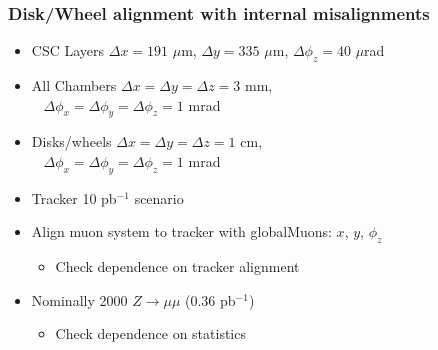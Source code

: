 \documentclass[compress]{beamer}
\begin{document}
\begin{frame}
\frametitle{Disk/Wheel alignment with internal misalignments}
\begin{itemize}\setlength{\itemsep}{0.25 cm}
  \item CSC Layers $\Delta x = 191$ $\mu$m, $\Delta y = 335$ $\mu$m, $\Delta \phi_z = 40$ $\mu$rad
  \item All Chambers $\Delta x = \Delta y = \Delta z = 3$ mm, \\ \mbox{ } \hfill $\Delta \phi_x = \Delta \phi_y = \Delta \phi_z = 1$ mrad
  \item Disks/wheels $\Delta x = \Delta y = \Delta z = 1$ cm, \\ \mbox{ } \hfill $\Delta \phi_x = \Delta \phi_y = \Delta \phi_z = 1$ mrad
  \item Tracker 10 pb$^{-1}$ scenario
\end{itemize}

\vfill
\begin{itemize}\setlength{\itemsep}{0.25 cm}
  \item Align muon system to tracker with globalMuons: $x$, $y$, $\phi_z$
\begin{itemize}
  \item Check dependence on tracker alignment
\end{itemize}

  \item Nominally 2000 $Z\to\mu\mu$ (0.36 pb$^{-1}$)
\begin{itemize}
  \item Check dependence on statistics
\end{itemize}
\end{itemize}
\end{frame}
\end{document}
